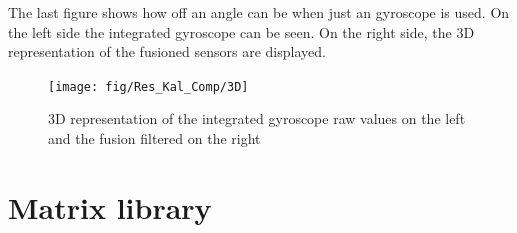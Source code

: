 The last figure shows how off an angle can be when just an gyroscope is used. On the left side the integrated gyroscope can be seen. On the right side, the 3D representation of the fusioned sensors are displayed.
\begin{figure}[H]
	\centering\texttt{[image: fig/Res\_Kal\_Comp/3D]}
	\caption[3D representation of Kalman-filtered IMU-Data in MATLAB]{3D representation of the integrated gyroscope raw values on the left and the fusion filtered on the right}
	\label{fig:KalmanFilterResult:3D}
\end{figure}


\section{Matrix library}
\label{sec:MatrixLib}


